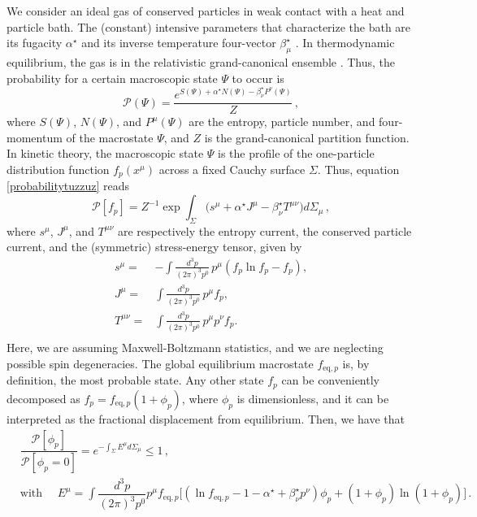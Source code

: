 \documentclass[aps,prd,preprint,nofootinbib,amsmath,amssymb,showpacs,longbibliography,singlecolumn,superscriptaddress,10pt]{revtex4-1}
\theoremstyle{plain}
\theoremstyle{definition}
\begin{document}
We consider an ideal gas of conserved particles in weak contact with a heat and particle bath. The (constant) intensive parameters that characterize the bath are its fugacity $\alpha^\star$ and its inverse temperature four-vector $\beta^\star_\mu$ \cite{Israel_1981_review,GavassinoTermometri}. In thermodynamic equilibrium, the gas is in the relativistic grand-canonical ensemble \cite{HakimBook}. Thus, the probability for a certain macroscopic state $\Psi$ to occur is
\begin{equation}\label{probabilitytuzzuz}
    \mathcal{P}(\Psi) = \dfrac{e^{S(\Psi)+\alpha^\star N(\Psi)-\beta_\nu^\star P^\nu(\Psi)}}{Z} \, ,
\end{equation}
where $S(\Psi)$, $N(\Psi)$, and $P^\mu(\Psi)$ are the entropy, particle number, and four-momentum of the macrostate $\Psi$, and $Z$ is the grand-canonical partition function.  In kinetic theory, the macroscopic state $\Psi$ is the profile of the one-particle distribution function $f_p(x^\mu)$ across a fixed Cauchy surface $\Sigma$. Thus, equation \eqref{probabilitytuzzuz} reads
\begin{equation}\label{PofF}
    \mathcal{P}[f_p] = Z^{-1} \exp \int_{\Sigma} \big(s^\mu+\alpha^\star J^\mu-\beta_\nu^\star T^{\mu \nu} \big)d\Sigma_\mu \, ,
\end{equation}
where $s^\mu$, $J^\mu$, and $T^{\mu \nu}$ are respectively the entropy current, the conserved particle current, and the (symmetric) stress-energy tensor, given by
\begin{equation}\label{Thedefinitions}
\begin{split}
    s^{\mu} ={}& - \int \frac{d^3p}{(2\pi)^3 p^0} \, p^{\mu} \left( f_p \ln f_p - f_p \right) , \\
    J^{\mu} ={}& \int \frac{d^3p}{(2\pi)^3 p^0} \, p^{\mu} f_p ,\\
    T^{\mu\nu} ={}& \int \frac{d^3p}{(2\pi)^3 p^0} \, p^{\mu} p^{\nu} f_p .\\
    \end{split}
\end{equation}
Here, we are assuming Maxwell-Boltzmann statistics, and we are neglecting possible spin degeneracies. The global equilibrium macrostate $f_{\text{eq},p}$ is, by definition, the most probable state. Any other state $f_p$ can be conveniently decomposed as $f_p=f_{\text{eq},p}(1+\phi_p)$, where $\phi_p$ is dimensionless, and it can be interpreted as the fractional displacement from equilibrium. Then, we have that
\begin{equation}\label{gringone}
\begin{split}
& \dfrac{\mathcal{P}[\phi_p]}{\mathcal{P}[\phi_p{=}0]} = e^{-\int_\Sigma E^\mu d\Sigma_\mu} \leq 1 \, ,\\
   & \text{with } \quad E^\mu = \int \dfrac{d^3 p}{(2\pi)^3 p^0} p^\mu f_{\text{eq},p} \bigg[ (\ln f_{\text{eq},p}{-}1{-}\alpha^\star{+}\beta^\star_\nu p^\nu)\phi_p {+}(1{+}\phi_p)\ln(1{+}\phi_p)\bigg] \, .
    \end{split}
\end{equation}
\end{document}
